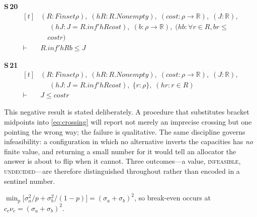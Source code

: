 \noindent\textbf{S\,20}\quad{}
{\footnotesize\[ \begin{aligned}[t]
&(\mathit{R} : \mathit{Finset} \rho ),\; (\mathit{hR} : \mathit{R}.\mathit{Nonempty}),\; (\mathit{cost} : \rho \to \mathbb{R} ),\; (\mathit{J} : \mathbb{R} ),\\
&\quad \; (\mathit{hJ} : \mathit{J} = \mathit{R}.\mathit{inf'} \mathit{hR} \mathit{cost}),\; (\mathit{b} : \rho \to \mathbb{R} ),\; (\mathit{hb} : \forall \mathit{r} \in \mathit{R}, \mathit{b} \mathit{r} \leq\\
&\quad \mathit{cost} \mathit{r})\\
\vdash\;&\mathit{R}.\mathit{inf'} \mathit{hR} \mathit{b} \leq \mathit{J}
\end{aligned} \]}

\noindent\textbf{S\,21}\quad{}
{\footnotesize\[ \begin{aligned}[t]
&(\mathit{R} : \mathit{Finset} \rho ),\; (\mathit{hR} : \mathit{R}.\mathit{Nonempty}),\; (\mathit{cost} : \rho \to \mathbb{R} ),\; (\mathit{J} : \mathbb{R} ),\\
&\quad \; (\mathit{hJ} : \mathit{J} = \mathit{R}.\mathit{inf'} \mathit{hR} \mathit{cost}),\; \{ \mathit{r} : \rho \},\; (\mathit{hr} : \mathit{r} \in \mathit{R})\\
\vdash\;&\mathit{J} \leq \mathit{cost} \mathit{r}
\end{aligned} \]}


This negative result is stated deliberately. A procedure that substitutes bracket midpoints
into \eqref{eq:crossing} will report not merely an imprecise crossing but one pointing the
wrong way; the failure is qualitative. The same discipline governs infeasibility: a
configuration in which no alternative inverts the capacities has \emph{no} finite value, and
returning a small number for it would tell an allocator the answer is about to flip when it
cannot. Three outcomes---a value, \textsc{infeasible}, \textsc{undecided}---are therefore
distinguished throughout rather than encoded in a sentinel number.

\begin{theorem}
\label{thm:breakeven}
$\min_{p}\bigl[\sigma_{a}^{2}/p+\sigma_{b}^{2}/(1-p)\bigr]=(\sigma_{a}+\sigma_{b})^{2}$, so
break-even occurs at $c_{c}\nu_{c}=(\sigma_{a}+\sigma_{b})^{2}$.
\end{theorem}


